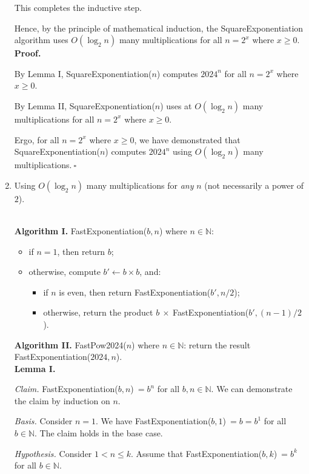 \begin{enumerate}
\begin{solution}
This completes the inductive step.

Hence, by the principle of mathematical induction, the {\sc SquareExponentiation} algorithm uses $O(\log_2n)$ many multiplications for all $n=2^x$ where $x\geq 0$.\\

\textbf{Proof. }

By Lemma I, {\sc SquareExponentiation}($n$) computes $2024^n$ for all $n=2^x$ where $x\geq 0$.

By Lemma II, {\sc SquareExponentiation}($n$) uses at $O(\log_2n)$ many multiplications for all $n=2^x$ where $x\geq 0$.

Ergo, for all $n=2^x$ where $x\geq 0$, we have demonstrated that {\sc SquareExponentiation}($n$) computes $2024^n$ using $O(\log_2n)$ many multiplications.$~\square$
\end{solution}
\newpage
\item Using $O(\log_2 n)$ many multiplications for \emph{any} $n$ (not necessarily a power of $2$).
\begin{solution}\\

\textbf{Algorithm I. }{\sc FastExponentiation}($b,n$) where $n\in\mathbb{N}$:
\begin{itemize}
\item if $n=1$, then return $b$;
\item otherwise, compute $b'\leftarrow b\times b$, and:
\begin{itemize}
    \item if $n$ is even, then return {\sc FastExponentiation}($b',n/2$);
    \item otherwise, return the product $b~\times~${\sc FastExponentiation}($b',(n-1)/2$).
\end{itemize}
\end{itemize}

\textbf{Algorithm II. }{\sc FastPow2024($n$)} where $n\in\mathbb{N}$: return the result {\sc FastExponentiation}($2024,n$).\\

\textbf{Lemma I.}

\textit{Claim. }{\sc FastExponentiation}($b,n$)$~=b^n$ for all $b,n\in\mathbb{N}$. We can demonstrate the claim by induction on $n$.

\textit{Basis. }Consider $n=1$. We have {\sc FastExponentiation}($b,1$)$~=b=b^1$ for all $b\in\mathbb{N}$. The claim holds in the base case.

\textit{Hypothesis. }Consider $1<n\leq k$. Assume that {\sc FastExponentiation}($b,k$)$~=b^k$ for all $b\in\mathbb{N}$.


\end{solution}
\end{enumerate}

